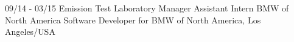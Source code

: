 \documentclass[]{friggeri-cv}
\begin{document}
\begin{entrylist}
  \entry
    {09/14 - 03/15}
    {Emission Test Laboratory Manager Assistant Intern}
    {BMW of North America}
    {Software Developer for BMW of North America, Los Angeles/USA\\}
\end{entrylist}

\newpage
\end{document}
